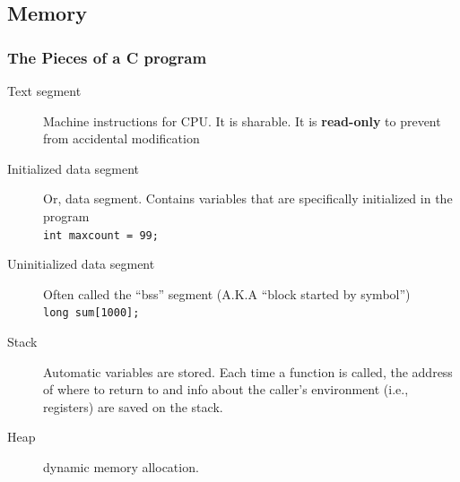 \documentclass[newPxFont,sthlmFooter,nooffset]{beamer}
\begin{document}
\subsection{Memory}


\begin{frame}[t]
  \frametitle{The Pieces of a C program}
  \begin{description}
  \item[Text segment] Machine instructions for CPU. It is sharable. It is \textbf{read-only} to prevent from accidental modification
  \item[Initialized data segment] Or, data segment. Contains variables that are specifically initialized in the program \\
\texttt{int maxcount = 99;}
\item[Uninitialized data segment] Often called the ``bss'' segment (A.K.A ``block started by symbol'') \\
\texttt{long sum[1000];}
\item[Stack] Automatic variables are stored. Each time a function is called, the address of where to return to and info about the caller's environment (i.e., registers) are saved on the stack.
\item[Heap] dynamic memory allocation. 
  \end{description}


\end{frame}
\end{document}
